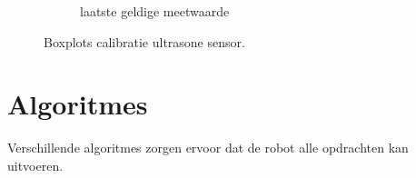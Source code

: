 \documentclass[tt3]{penoverslag}
\begin{document}
\begin{figure}
\begin{subfigure}[h]{0.31\textwidth}
                \caption{laatste geldige meetwaarde}
        \end{subfigure}
 \caption{Boxplots calibratie ultrasone sensor.}
\label{fig:calibUS}
\end{figure}



\section{Algoritmes} %
\label{sec:algo}
Verschillende algoritmes zorgen ervoor dat de robot alle opdrachten kan uitvoeren.

%
\end{document}
